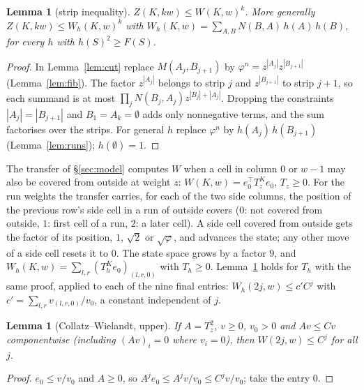 \documentclass[11pt]{amsart}
\newtheorem{lemma}[theorem]{Lemma}
\theoremstyle{definition}
\theoremstyle{remark}
\begin{document}
\begin{lemma}[strip inequality]\label{lem:strip}
$Z(K, kw) \le W(K, w)^k$. More generally $Z(K, kw) \le W_h(K, w)^k$ with
$W_h(K, w) = \sum_{A, B} N(B, A)\, h(A)\, h(B)$, for every $h$ with $h(S)^2 \ge F(S)$.
\end{lemma}
\begin{proof}
In Lemma~\ref{lem:cut} replace $M(A_j, B_{j+1})$ by $\varphi^n = z^{|A_j|} z^{|B_{j+1}|}$
(Lemma~\ref{lem:fib}). The factor $z^{|A_j|}$ belongs to strip $j$ and $z^{|B_{j+1}|}$ to strip
$j+1$, so each summand is at most $\prod_j N(B_j, A_j) z^{|B_j| + |A_j|}$. Dropping the constraints
$|A_j| = |B_{j+1}|$ and $B_1 = A_k = \emptyset$ adds only nonnegative terms, and the sum
factorises over the strips. For general $h$ replace $\varphi^n$ by $h(A_j)\, h(B_{j+1})$
(Lemma~\ref{lem:runs}); $h(\emptyset) = 1$.
\end{proof}

The transfer of \S\ref{sec:model} computes $W$ when a cell in column $0$ or $w-1$ may also be
covered from outside at weight $z$: $W(K, w) = e_0^\top T_z^K e_0$, $T_z \ge 0$. For the run weights
the transfer carries, for each of the two side columns, the position of the previous row's side
cell in a run of outside covers ($0$: not covered from outside, $1$: first cell of a run, $2$: a
later cell). A side cell covered from outside gets the factor of its position, $1$, $\sqrt2$ or
$\sqrt\varphi$, and advances the state; any other move of a side cell resets it to $0$. The state
space grows by a factor $9$, and $W_h(K, w) = \sum_{l, r} (T_h^K e_{0})_{(l, r, 0)}$ with
$T_h \ge 0$. Lemma~\ref{lem:cwup} holds for $T_h$ with the same proof, applied to each of the nine
final entries: $W_h(2j, w) \le c' C^j$ with $c' = \sum_{l, r} v_{(l, r, 0)} / v_0$, a constant
independent of $j$.

\begin{lemma}[Collatz--Wielandt, upper]\label{lem:cwup}
If $A = T_z^2$, $v \ge 0$, $v_0 > 0$ and $Av \le Cv$ componentwise (including $(Av)_i = 0$
where $v_i = 0$), then $W(2j, w) \le C^j$ for all $j$.
\end{lemma}
\begin{proof}
$e_0 \le v/v_0$ and $A \ge 0$, so $A^j e_0 \le A^j v / v_0 \le C^j v / v_0$; take the entry $0$.
\end{proof}
\end{document}
